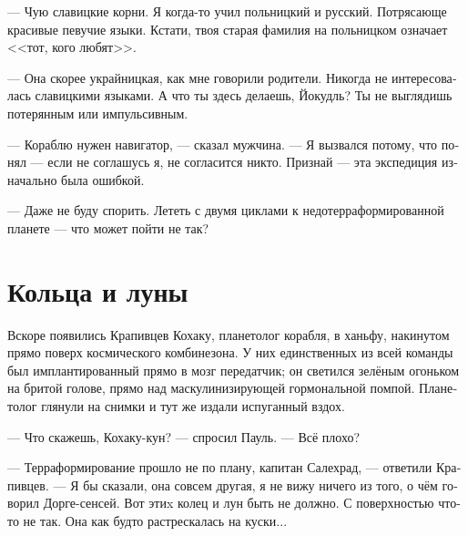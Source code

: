 \documentclass[a4paper,12pt,fleqn]{book}\usepackage{polyglossia}\setdefaultlanguage[babelshorthands=true]{russian}\setotherlanguage{english}\defaultfontfeatures{Ligatures=TeX,Mapping=tex-text}\usepackage{xcolor}\newcommand{\ml}[3]{#2}
\begin{document}
\ml{$0$}
{--- Чую славицкие корни.}
{``I recognize Slawisch roots.}
Я когда-то учил польницкий и русский.
Потрясающе красивые певучие языки.
\ml{$0$}
{Кстати, твоя старая фамилия на польницком означает <<тот, кого любят>>.}
{By the way, your deadname means `the one who are loved' in Polnisch.''}

\ml{$0$}
{--- Она скорее украйницкая, как мне говорили родители.}
{``It's more of Ukrainisch, my parents told me.}
\ml{$0$}
{Никогда не интересовалась славицкими языками.}
{I've never been interested in Slawisch languages.}
\ml{$0$}
{А что ты здесь делаешь, Йокудль?}
{What are you doing here, Jökull?}
\ml{$0$}
{Ты не выглядишь потерянным или импульсивным.}
{You don't look lost or impulsive.''}

--- Кораблю нужен навигатор, --- сказал мужчина.
--- Я вызвался потому, что понял --- если не соглашусь я, не согласится никто.
\ml{$0$}
{Признай --- эта экспедиция изначально была ошибкой.}
{Admit it, this expedition was just a big mistake from the beginning.''}

\ml{$0$}
{--- Даже не буду спорить.}
{``I wouldn't argue with that.}
\ml{$0$}
{Лететь с двумя циклами к недотерраформированной планете --- что может пойти не так?}
{A two-cycle flight to the incompletely terraformed planet, what can go wrong?''}

\section{Кольца и луны}

Вскоре появились Крапивцев Кохаку, планетолог корабля, в ханьфу, накинутом прямо поверх космического комбинезона.
У них единственных из всей команды был имплантированный прямо в мозг передатчик;
он светился зелёным огоньком на бритой голове, прямо над маскулинизирующей гормональной помпой. 
Планетолог глянули на снимки и тут же издали испуганный вздох.

\ml{$0$}
{--- Что скажешь, Кохаку-кун? --- спросил Пауль.}
{``What do you think, Kohaku-kun?'' Paul asked.}
\ml{$0$}
{--- Всё плохо?}
{``How bad is it?''}

\ml{$0$}
{--- Терраформирование прошло не по плану, капитан Салехрад, --- ответили Крапивцев.}
{``Terraformation went sideways, Captain Salechrad,'' Krapiwtzew answered.}
\ml{$0$}
{--- Я бы сказали, она совсем другая, я не вижу ничего из того, о чём говорил Дорге-сенсей.}
{``I would say, it's completely different, I see nothing of what Dorgue-sensei had told about.}
\ml{$0$}
{Вот этиx колец и лун быть не должно.}
{Those rings and loonas aren't supposed to be.}
\ml{$0$}
{С поверхностью что-то не так.}
{Something's wrong about the surface.}
\ml{$0$}
{Она как будто растрескалась на куски...}
{It looks like cracked apart ...''}
\end{document}
